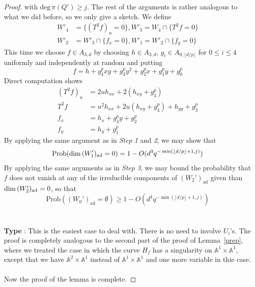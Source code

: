 \documentclass[12pt]{article}
\theoremstyle{plain}
\theoremstyle{definition}
\newcommand{\IA}{\mathbb{A}}
\renewcommand{\deg}{\mathrm{deg}\,}
\renewcommand\dim{{\rm dim\,}}
\newcommand{\<}{\langle}
\renewcommand{\>}{\rangle}
\newcommand{\Prob}{\mathrm{Prob}}
\newcommand{\ad}{\mathrm{ad}}
\newcommand{\yk}{\lfloor d/p \rfloor}
\begin{document}
\begin{proof}
with $\deg \pi(Q') \ge j$. 
The rest of the arguments is rather analogous to what we did before, so we only give a sketch. We define 
\begin{align*}
W'_4 &= \{ (T^2 f)_u = 0 \}, W'_3 = W_4 \cap \{ T^2 f = 0 \} \\
W'_2 &= W'_3 \cap \{ f_x = 0 \}, W'_1 = W'_2 \cap \{ f_y = 0 \}
\end{align*}
This time we choose $f \in A_{3, d}$ by choosing $h \in A_{3, d}$, $g_i \in A_{0, \yk}$ for $0 \le i \le 4$ uniformly and independently at random and putting 
$$ f = h + g_4^p xy + g_3^p y^2 + g_2^p x + g_1^p y + g_0^p $$
Direct computation shows 
\begin{align*}
(T^2 f )_u &= 2u h_{xx} + 2(h_{xy} + g_4^p) \\
T^2 f &= u^2 h_{xx} + 2 u (h_{xy} + g_4^p) + h_{yy} + g_3^p \\
f_x &= h_x + g_4^p y + g_2^p \\
f_y &= h_y + g_1^p 
\end{align*}
By applying the same argument as in \textit{Step 1} and \textit{2}, we may show that 
$$ \Prob(\dim(W'_1)_\ad = 0) = 1 - O(d^3 q^{- \min(\yk + 1, j)}) $$
By applying the same arguments as in \textit{Step 3}, we may bound the probability that $f$ does not vanish at any of the irreducible components of $(W_2')_\ad$ given than $\dim (W'_2)_\ad = 0$, so that 
$$ \Prob((W_0')_\ad = \emptyset) \ge 1 - O(d^4 q^{- \min(\yk + 1, j)}) $$\\\\
\textbf{Type \uppercase\expandafter{}}: This is the easiest case to deal with. There is no need to involve $U_i$'s. The proof is completely analogous to the second part of the proof of Lemma~\ref{prep}, where we treated the case in which the curve $H_f$ has a singularity on $\IA^1 \times \IA^1$, except that we have $\IA^2 \times \IA^1$ instead of $\IA^1 \times \IA^1$ and one more variable in thie case. \\\\ 
Now the proof of the lemma is complete. 
\end{proof}
\end{document}
